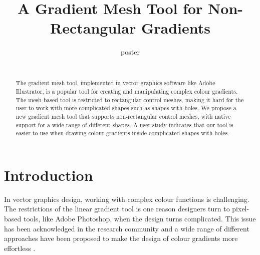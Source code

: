 \documentclass{egpubl}
\title[Non-rectangular gradient mesh tool]
{A Gradient Mesh Tool for Non-Rectangular Gradients}
\author[poster]
{\parbox{\textwidth}{\centering poster}
	\\
	{\parbox{\textwidth}{\centering } }
}
\begin{document}
	
	
	\maketitle
	
	\begin{abstract}
		The gradient mesh tool, implemented in vector graphics software like Adobe Illustrator, is a popular tool for creating and manipulating complex colour gradients. The mesh-based tool is restricted to rectangular control meshes, making it hard for the user to work with more complicated shapes such as shapes with holes. We propose a new gradient mesh tool that supports non-rectangular control meshes, with native support for a wide range of different shapes. A user study indicates that our tool is easier to use when drawing colour gradients inside complicated shapes with holes.
		
		\begin{classification} %
		\end{classification}
		
	\end{abstract}
	
	\section{Introduction}
	\label{sec:intro}
	
	In vector graphics design, working with complex colour functions is challenging. The restrictions of the linear gradient tool is one reason designers turn to pixel-based tools, like Adobe Photoshop, when the design turns complicated. This issue has been acknowledged in the research community and a wide range of different approaches have been proposed to make the design of colour gradients more effortless \cite{Orzan:2008,Lopez-Moreno:2013, Vergne:2012, Shao:2012}.
	
\end{document}
